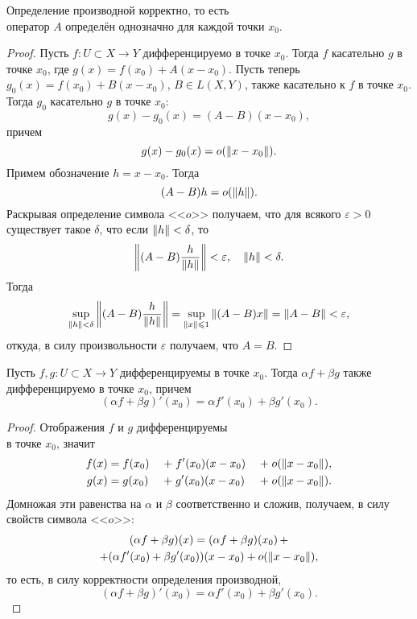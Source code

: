 \begin{theorem}
    Определение производной корректно, то есть\\оператор $A$ определён однозначно 
    для каждой точки $x_0$.
\end{theorem}

\begin{proof}
    Пусть $f \colon U \subset X \to Y$ дифференцируемо в точке $x_0$. Тогда
    $f$ касательно $g$ в точке $x_0$, где $g(x) = f(x_0) + A(x - x_0)$.
    Пусть теперь $g_0(x) = f(x_0) + B(x-x_0)$, $B \in L(X, Y)$,
     также касательно к $f$ в точке $x_0$.
    Тогда $g_0$ касательно $g$ в точке $x_0$:
    \[ g(x) - g_0(x) = (A-B)(x - x_0), \]
    причем
    \[ g(x) - g_0(x) = o(\left\|x - x_0\right\|). \]
    Примем обозначение $h = x - x_0$. Тогда
    \[ (A - B)h = o(\left\|h\right\|). \]
    Раскрывая определение символа <<$o$>> получаем, что для всякого $\varepsilon > 0$
    существует такое $\delta$, что если $\left\|h\right\| < \delta$, то 
    \[ \left\|(A-B)\frac{h}{\left\|h\right\|}\right\| < \varepsilon, \quad \left\|h\right\| < \delta. \]
    Тогда
    \[ \sup_{\left\|h\right\| < \delta} \left\|(A-B)\frac{h}{\left\|h\right\|}\right\| 
        = \sup_{\left\|x\right\| \leqslant 1} \left\|(A-B)x\right\| = \left\|A-B\right\| < \varepsilon, \]
    откуда, в силу произвольности $\varepsilon$ получаем, что $A = B$.
\end{proof}

\begin{theorem}
    Пусть $f, g \colon U \subset X \to Y$ дифференцируемы в точке $x_0$. Тогда
    $\alpha f + \beta g$ также дифференцируемо в точке $x_0$, причем
    \[ (\alpha f + \beta g)'(x_0) = \alpha f'(x_0) + \beta g'(x_0). \]
\end{theorem}

\begin{proof}
    Отображения $f$ и $g$ дифференцируемы\\в точке $x_0$, значит
    \begin{alignat*}{6}
        f(x) &= f(x_0) \; &+& \; f'(x_0)(x - x_0) \; &+& \; o(\left\|x-x_0\right\|), \\
        g(x) &= g(x_0) \; &+& \; g'(x_0)(x - x_0) \; &+& \; o(\left\|x-x_0\right\|).
    \end{alignat*}
    Домножая эти равенства на $\alpha$ и $\beta$ соответственно и сложив, получаем, в силу
    свойств символа <<$o$>>:
    \begin{multline*}
        (\alpha f + \beta g)(x) = (\alpha f + \beta g)(x_0) \, + \\ +
            (\alpha f'(x_0) + \beta g'(x_0))(x - x_0) + o(\left\|x-x_0\right\|),
    \end{multline*}
    то есть, в силу корректности определения производной,
    \[ (\alpha f + \beta g)'(x_0) = \alpha f'(x_0) + \beta g'(x_0). \]
\end{proof}

